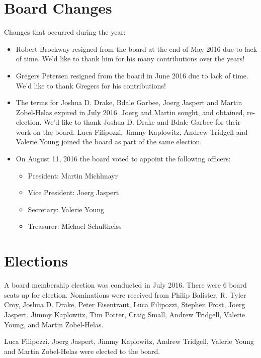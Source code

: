 \documentclass[letterpaper]{report}
\begin{document}
\section{Board Changes}

Changes that occurred during the year:

\begin{itemize}

\item Robert Brockway resigned from the board at the end of May 2016 due
to lack of time.  We'd like to thank him for his many contributions over
the years!

\item Gregers Petersen resigned from the board in June 2016 due to lack
of time.  We'd like to thank Gregers for his contributions!

\item The terms for Joshua D. Drake, Bdale Garbee, Joerg Jaspert and
Martin Zobel-Helas expired in July 2016.  Joerg and Martin sought, and
obtained, re-election.  We'd like to thank Joshua D. Drake and Bdale
Garbee for their work on the board.  Luca Filipozzi, Jimmy Kaplowitz,
Andrew Tridgell and Valerie Young joined the board as part of the same
election.

\item On August 11, 2016 the board voted to appoint the following
officers:

\begin{itemize}
\item President: Martin Michlmayr
\item Vice President: Joerg Jaspert
\item Secretary: Valerie Young
\item Treasurer: Michael Schultheiss
\end{itemize}

\end{itemize}

\section{Elections}

A board membership election was conducted in July 2016.  There were 6
board seats up for election.  Nominations were received from Philip
Balister, R. Tyler Croy, Joshua D. Drake, Peter Eisentraut, Luca
Filipozzi, Stephen Frost, Joerg Jaspert, Jimmy Kaplowitz, Tim Potter,
Craig Small, Andrew Tridgell, Valerie Young, and Martin Zobel-Helas.

Luca Filipozzi, Joerg Jaspert, Jimmy Kaplowitz, Andrew Tridgell, Valerie
Young and Martin Zobel-Helas were elected to the board.
\end{document}
